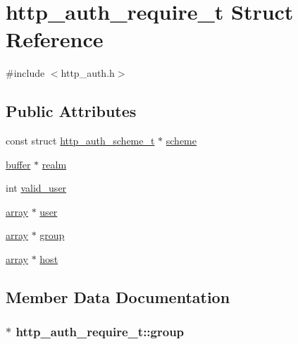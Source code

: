 \hypertarget{structhttp__auth__require__t}{\section{http\-\_\-auth\-\_\-require\-\_\-t Struct Reference}
\label{structhttp__auth__require__t}
}


{\ttfamily \#include $<$http\-\_\-auth.\-h$>$}

\subsection*{Public Attributes}
\begin{DoxyCompactItemize}
\item 
const struct \hyperlink{structhttp__auth__scheme__t}{http\-\_\-auth\-\_\-scheme\-\_\-t} $\ast$ \hyperlink{structhttp__auth__require__t_a954a85447f059f76d25965b0f245d828}{scheme}
\item 
\hyperlink{structbuffer}{buffer} $\ast$ \hyperlink{structhttp__auth__require__t_aa16fcd03a3089dff8de91e1c3b9ea05e}{realm}
\item 
int \hyperlink{structhttp__auth__require__t_a939171e2f0f71928f4b93aa91e83b459}{valid\-\_\-user}
\item 
\hyperlink{structarray}{array} $\ast$ \hyperlink{structhttp__auth__require__t_a852fde18e5fca4b85de09b1fab2aadb0}{user}
\item 
\hyperlink{structarray}{array} $\ast$ \hyperlink{structhttp__auth__require__t_a18ac3fd4fae41d3a59d91b891859ab0e}{group}
\item 
\hyperlink{structarray}{array} $\ast$ \hyperlink{structhttp__auth__require__t_a9ce819a42f5767702d67b60ca5f94925}{host}
\end{DoxyCompactItemize}


\subsection{Member Data Documentation}
\hypertarget{structhttp__auth__require__t_a18ac3fd4fae41d3a59d91b891859ab0e}{
\subsubsection[{group}]{$\ast$ http\-\_\-auth\-\_\-require\-\_\-t\-::group}}\label{structhttp__auth__require__t_a18ac3fd4fae41d3a59d91b891859ab0e}


